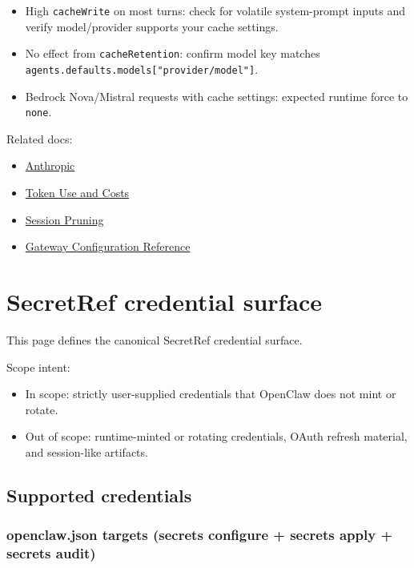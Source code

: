 \begin{itemize}
  \item High \texttt{cacheWrite} on most turns: check for volatile system-prompt inputs and verify model/provider supports your cache settings.
  \item No effect from \texttt{cacheRetention}: confirm model key matches \texttt{agents.defaults.models["provider/model"]}.
  \item Bedrock Nova/Mistral requests with cache settings: expected runtime force to \texttt{none}.
\end{itemize}


Related docs:

\begin{itemize}
  \item \href{/providers/anthropic}{Anthropic}
  \item \href{/reference/token-use}{Token Use and Costs}
  \item \href{/concepts/session-pruning}{Session Pruning}
  \item \href{/gateway/configuration-reference}{Gateway Configuration Reference}
\end{itemize}



\clearpage

\section{SecretRef credential surface}


This page defines the canonical SecretRef credential surface.

Scope intent:

\begin{itemize}
  \item In scope: strictly user-supplied credentials that OpenClaw does not mint or rotate.
  \item Out of scope: runtime-minted or rotating credentials, OAuth refresh material, and session-like artifacts.
\end{itemize}


\subsection{Supported credentials}


\subsubsection{openclaw.json targets (secrets configure + secrets apply + secrets audit)}



